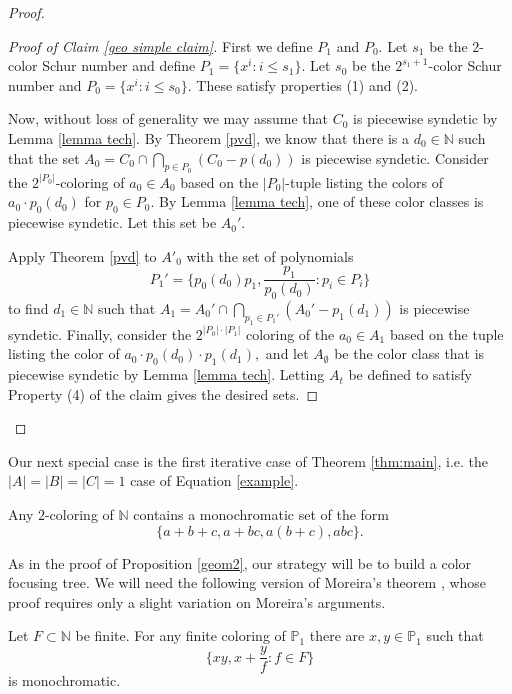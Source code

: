\documentclass[tocmacros]{daj}
\begin{document}
\begin{proof}
\begin{proof}[Proof of Claim \ref{geo simple claim}]
First we define $P_1$ and $P_0.$ Let $s_1$ be the $2$-color Schur number and define $P_1=\{x^i: i\leq s_1\}.$  Let $s_0$ be the $2^{s_1+1}$-color Schur number and $P_0=\{x^i: i\leq s_0\}.$  These satisfy properties (1) and (2).

Now, without loss of generality we may assume that $C_0$ is piecewise syndetic by Lemma \ref{lemma tech}.  By Theorem \ref{pvd}, we know that there is a $d_0\in \mathbb{N}$ such that the set $A_0=C_0\cap\bigcap_{p\in P_0} (C_0-p(d_0))$ is piecewise syndetic.  Consider the $2^{|P_0|}$-coloring of $a_0\in A_0$ based on the $|P_0|$-tuple listing the colors of $a_0\cdot p_0(d_0)$ for $p_0\in P_0.$  By Lemma \ref{lemma tech}, one of these color classes is piecewise syndetic.  Let this set be $A_0'.$

Apply Theorem \ref{pvd} to $A'_0$ with the set of polynomials $$P_1'=\{p_0(d_0) p_1,\frac{p_1}{p_0(d_0)}: p_i\in P_i\} $$ to find $d_1\in \mathbb{N}$ such that $A_1=A_0'\cap\bigcap_{p_1\in P_1'} (A_0'-p_1(d_1))$ is piecewise syndetic.  Finally, consider the $2^{|P_0|\cdot|P_1|}$ coloring of the $a_0\in A_1$ based on the tuple listing the color of $a_0\cdot p_0(d_0)\cdot p_1(d_1),$ and let $A_\emptyset$ be the color class that is piecewise syndetic by Lemma \ref{lemma tech}.  Letting $A_t$ be defined to satisfy Property (4) of the claim gives the desired sets.
\end{proof}



\end{proof}


Our next special case is the first iterative case of Theorem \ref{thm:main}, i.e. the $|A|=|B|=|C|=1$ case of Equation \ref{example}.

\begin{proposition}\label{iterated 2}
Any $2$-coloring of $\mathbb{N}$ contains a monochromatic set of the form $$\{a+b+c,a+bc,a(b+c),abc\}.$$
\end{proposition}

As in the proof of Proposition \ref{geom2}, our strategy will be to build a color focusing tree.  We will need the following version of Moreira's theorem \cite{moreira2017monochromatic}, whose proof requires only a slight variation on Moreira's arguments.  

\begin{theorem}\label{mor}
Let $F\subset \mathbb{N}$ be finite.  For any finite coloring of $\mathbb{P}_1$ there are $x,y\in\mathbb{P}_1$ such that $$\{xy, x+\frac{y}{f}:f\in F\}$$ is monochromatic.  
\end{theorem}
\end{document}
